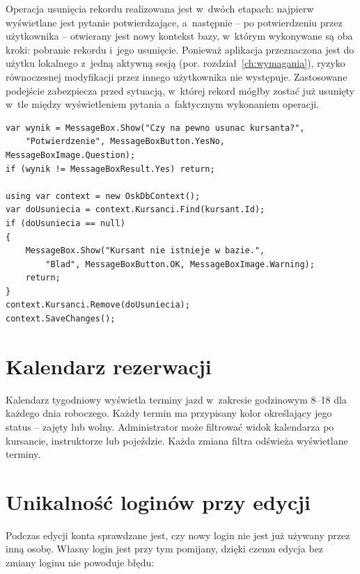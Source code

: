 Operacja usuni\k{e}cia rekordu realizowana jest w~dw\'{o}ch etapach: najpierw
wy\'{s}wietlane jest pytanie potwierdzaj\k{a}ce, a~nast\k{e}pnie -- po
potwierdzeniu przez u\.{z}ytkownika -- otwierany jest nowy kontekst bazy,
w~kt\'{o}rym wykonywane s\k{a} oba kroki: pobranie rekordu i~jego usuni\k{e}cie.
Poniewa\.{z} aplikacja przeznaczona jest do u\.{z}ytku lokalnego z~jedn\k{a}
aktywn\k{a} sesj\k{a} (por. rozdzia\l{}~\ref{ch:wymagania}), ryzyko
r\'{o}wnoczesnej modyfikacji przez innego u\.{z}ytkownika nie wyst\k{e}puje.
Zastosowane podej\'{s}cie zabezpiecza przed sytuacj\k{a}, w~kt\'{o}rej rekord
m\'{o}g\l{}by zosta\'{c} ju\.{z} usuni\k{e}ty w~tle mi\k{e}dzy wy\'{s}wietleniem
pytania a~faktycznym wykonaniem operacji.

\begin{lstlisting}[language={[Sharp]C}, caption={Zabezpieczenie przed wy\'{s}cigiem danych przy usuwaniu}, label=lst:toctou]
var wynik = MessageBox.Show("Czy na pewno usunac kursanta?",
    "Potwierdzenie", MessageBoxButton.YesNo, MessageBoxImage.Question);
if (wynik != MessageBoxResult.Yes) return;

using var context = new OskDbContext();
var doUsuniecia = context.Kursanci.Find(kursant.Id);
if (doUsuniecia == null)
{
    MessageBox.Show("Kursant nie istnieje w bazie.",
        "Blad", MessageBoxButton.OK, MessageBoxImage.Warning);
    return;
}
context.Kursanci.Remove(doUsuniecia);
context.SaveChanges();
\end{lstlisting}

\section{Kalendarz rezerwacji}

Kalendarz tygodniowy wy\'{s}wietla terminy jazd w~zakresie godzinowym 8--18
dla ka\.{z}dego dnia roboczego. Ka\.{z}dy termin ma przypisany kolor
okre\'{s}laj\k{a}cy jego status -- zaj\k{e}ty lub wolny.
Administrator mo\.{z}e filtrowa\'{c} widok kalendarza po kursancie,
instruktorze lub poje\'{z}dzie. Ka\.{z}da zmiana filtra od\'{s}wie\.{z}a
wy\'{s}wietlane terminy.

\section{Unikalność login\'{o}w przy edycji}

Podczas edycji konta sprawdzane jest, czy nowy login nie jest ju\.{z} u\.{z}ywany
przez inn\k{a} osob\k{e}. W\l{}asny login jest przy tym pomijany, dzi\k{e}ki czemu
edycja bez zmiany loginu nie powoduje b\l{}\k{e}du:

